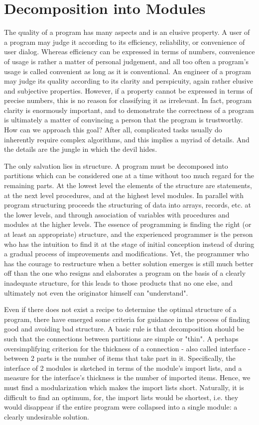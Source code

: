 \chapter{Decomposition into Modules}
The quality of a program has many aspects and is an elusive property. A user of a program may
judge it according to its efficiency, reliability, or convenience of user dialog. Whereas efficiency can
be expressed in terms of numbers, convenience of usage is rather a matter of personal judgement,
and all too often a program's usage is called convenient as long as it is conventional. An engineer
of a program may judge its quality according to its clarity and perspicuity, again rather elusive and
subjective properties. However, if a property cannot be expressed in terms of precise numbers, this
is no reason for classifying it as irrelevant. In fact, program clarity is enormously important, and to
demonstrate the correctness of a program is ultimately a matter of convincing a person that the
program is trustworthy. How can we approach this goal? After all, complicated tasks usually do
inherently require complex algorithms, and this implies a myriad of details. And the details are the
jungle in which the devil hides.

The only salvation lies in structure. A program must be decomposed into partitions which can be
considered one at a time without too much regard for the remaining parts. At the lowest level the
elements of the structure are statements, at the next level procedures, and at the highest level
modules. In parallel with program structuring proceeds the structuring of data into arrays, records,
etc. at the lower levels, and through association of variables with procedures and modules at the
higher levels. The essence of programming is finding the right (or at least an appropriate) structure,
and the experienced programmer is the person who has the intuition to find it at the stage of initial
conception instead of during a gradual process of improvements and modifications. Yet, the
programmer who has the courage to restructure when a better solution emerges is still much better
off than the one who resigns and elaborates a program on the basis of a clearly inadequate
structure, for this leads to those products that no one else, and ultimately not even the originator
himself can "understand".

Even if there does not exist a recipe to determine the optimal structure of a program, there have
emerged some criteria for guidance in the process of finding good and avoiding bad structure. A
basic rule is that decomposition should be such that the connections between partitions are simple
or "thin". A perhaps oversimplifying criterion for the thickness of a connection - also called interface
- between 2 parts is the number of items that take part in it. Specifically, the interface of 2
modules is sketched in terms of the module's import lists, and a measure for the interface's
thickness is the number of imported items. Hence, we must find a modularization which makes the
import lists short. Naturally, it is difficult to find an optimum, for, the import lists would be shortest,
i.e. they would disappear if the entire program were collapsed into a single module: a clearly
undesirable solution.


